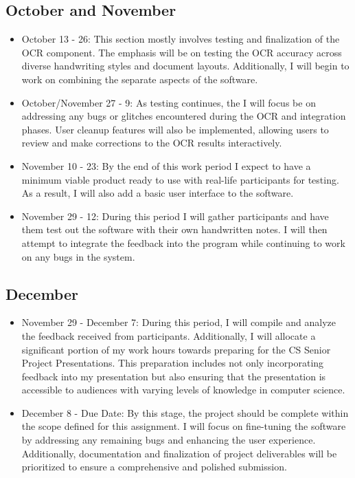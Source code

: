 \documentclass[10pt,twocolumn]{article}
\begin{document}
\subsection{October and November}
\begin{itemize}
  \item October 13 - 26: This section mostly involves testing and finalization of the OCR component. The emphasis will be on testing the OCR accuracy across diverse handwriting styles and document layouts. Additionally, I will begin to work on combining the separate aspects of the software.
  \item October/November 27 - 9: As testing continues, the I will focus be on addressing any bugs or glitches encountered during the OCR and integration phases. User cleanup features will also be implemented, allowing users to review and make corrections to the OCR results interactively.
  \item November 10 - 23: By the end of this work period I expect to have a minimum viable product ready to use with real-life participants for testing. As a result, I will also add a basic user interface to the software.
  \item November 29 - 12: During this period I will gather participants and have them test out the software with their own handwritten notes. I will then attempt to integrate the feedback into the program while continuing to work on any bugs in the system. 
\end{itemize}
\subsection{December}
\begin{itemize}
  \item November 29 - December 7: During this period, I will compile and analyze the feedback received from participants. Additionally, I will allocate a significant portion of my work hours towards preparing for the CS Senior Project Presentations. This preparation includes not only incorporating feedback into my presentation but also ensuring that the presentation is accessible to audiences with varying levels of knowledge in computer science.
    \item December 8 - Due Date: By this stage, the project should be complete within the scope defined for this assignment. I will focus on fine-tuning the software by addressing any remaining bugs and enhancing the user experience.  Additionally, documentation and finalization of project deliverables will be prioritized to ensure a comprehensive and polished submission. 
\end{itemize}

\printbibliography
\end{document}
